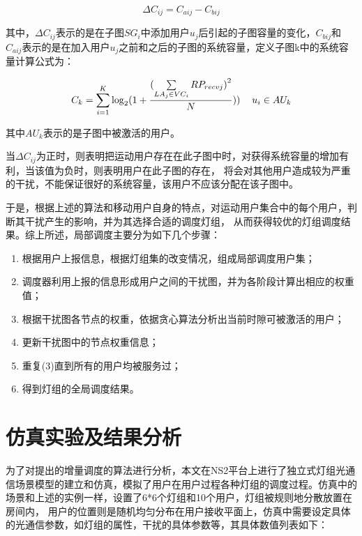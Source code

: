 \begin{equation}
    \Delta {C_{ij}} = {C_{aij}} - {C_{bij}}
\end{equation}

其中，$\Delta {C_{ij}}$表示的是在子图$SG_{i}$中添加用户$u_{j}$后引起的子图容量的变化，$C_{bij}$和$C_{aij}$表示的是在加入用户$u_{j}$之前和之后的子图的系统容量，定义子图k中的系统容量计算公式为：

\begin{equation}
    {C_k} = \sum\limits_{i = 1}^K {{{\log }_2}(1 + \frac{{{{(\sum\limits_{L{A_j} \in V{C_i}} {R{P_{recvj}}} )}^2}}}{N}))} {\kern 1pt} {\kern 1pt} {\kern 1pt} {\kern 1pt} {\kern 1pt} {\kern 1pt} {\kern 1pt} {\kern 1pt} {\kern 1pt} {\kern 1pt} {\kern 1pt} {\kern 1pt} {u_i} \in A{U_k}
\end{equation}

其中$AU_{k}$表示的是子图中被激活的用户。

当$\Delta {C_{ij}}$为正时，则表明把运动用户存在在此子图中时，对获得系统容量的增加有利，当该值为负时，则表明用户在此子图的存在，
将会对其他用户造成较为严重的干扰，不能保证很好的系统容量，该用户不应该分配在该子图中。

于是，根据上述的算法和移动用户自身的特点，对运动用户集合中的每个用户，判断其干扰产生的影响，并为其选择合适的调度灯组，
从而获得较优的灯组调度结果。综上所述，局部调度主要分为如下几个步骤：

\begin{enumerate}
    \item 根据用户上报信息，根据灯组集的改变情况，组成局部调度用户集；
    \item 调度器利用上报的信息形成用户之间的干扰图，并为各阶段计算出相应的权重值；
    \item 根据干扰图各节点的权重，依据贪心算法分析出当前时隙可被激活的用户；
    \item 更新干扰图中的节点权重信息；
    \item 重复(3)直到所有的用户均被服务过；
    \item 得到灯组的全局调度结果。
\end{enumerate}

\section{仿真实验及结果分析}\label{sec:iss-simulatioon-result}
为了对提出的增量调度的算法进行分析，本文在NS2平台上进行了独立式灯组光通信场景模型的建立和仿真，模拟了用户在用户过程各种灯组的调度过程。仿真中的场景和上述的实例一样，设置了6*6个灯组和10个用户，灯组被规则地分散放置在房间内，
用户的位置则是随机均匀分布在用户接收平面上，仿真中需要设定具体的光通信参数，如灯组的属性，干扰的具体参数等，其具体数值列表如下：

